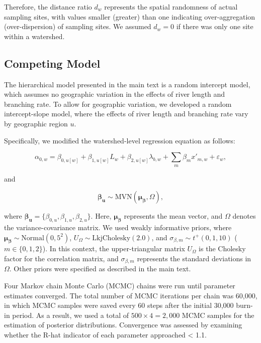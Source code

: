 \documentclass[11pt, class=article, crop=false]{standalone}
\theoremstyle{definition}
\begin{document}
Therefore, the distance ratio $d_{w}$ represents the spatial randomness of actual sampling sites, with values smaller (greater) than one indicating over-aggregation (over-dispersion) of sampling sites.
We assumed $d_{w} = 0$ if there was only one site within a watershed.

\subsection{Competing Model}

The hierarchical model presented in the main text is a random intercept model, which assumes no geographic variation in the effects of river length and branching rate. To allow for geographic variation, we developed a random intercept-slope model, where the effects of river length and branching rate vary by geographic region $u$.

Specifically, we modified the watershed-level regression equation as follows:

\begin{equation}
    \alpha_{0, w} = \beta_{0, u[w]} + \beta_{1, u[w]} L_w + \beta_{2, u[w]} \lambda_{b, w} + \sum_m \beta_m x'_{m, w} + \varepsilon_{w},
    \label{eq:watershed-average}
\end{equation}

and

\begin{equation}
    \boldsymbol{\beta_u} \sim \mbox{MVN}(\boldsymbol{\mu_{\beta}}, \Omega),
\end{equation}

where $\boldsymbol{\beta_u} = \{\beta_{0, u}, \beta_{1, u}, \beta_{2, u}\}$. Here, $\boldsymbol{\mu_{\beta}}$ represents the mean vector, and $\Omega$ denotes the variance-covariance matrix.
We used weakly informative priors, where $\boldsymbol{\mu_{\beta}} \sim \mbox{Normal}(0, 5^2)$, $U_{\Omega} \sim \mbox{LkjCholesky}(2.0)$, and $\sigma_{\beta, m} \sim t^+(0, 1, 10)$ ($m \in \{0, 1, 2\}$). In this context, the upper-triangular matrix $U_{\Omega}$ is the Cholesky factor for the correlation matrix, and $\sigma_{\beta, m}$ represents the standard deviations in $\Omega$.
Other priors were specified as described in the main text.

Four Markov chain Monte Carlo (MCMC) chains were run until parameter estimates
converged.
The total number of MCMC iterations per chain was 60,000, in which MCMC samples were saved every 60 steps after the initial 30,000 burn-in period.
As a result, we used a total of $500 \times 4 = 2,000$ MCMC samples for the estimation of posterior distributions.
Convergence was assessed by examining whether the R-hat indicator of each parameter approached < 1.1.

\newpage


\end{document}
